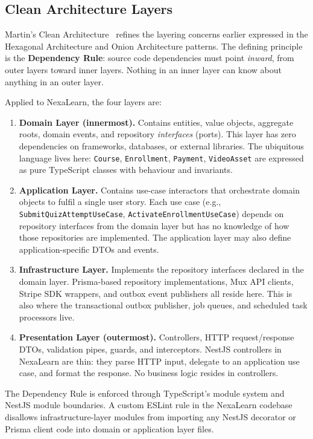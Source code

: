 \subsection{Clean Architecture Layers}

Martin's Clean Architecture~\cite{martin2017clean} refines the layering concerns earlier expressed in the Hexagonal Architecture and Onion Architecture patterns. The defining principle is the \textbf{Dependency Rule}: source code dependencies must point \textit{inward}, from outer layers toward inner layers. Nothing in an inner layer can know about anything in an outer layer.

Applied to NexaLearn, the four layers are:

\begin{enumerate}
  \item \textbf{Domain Layer (innermost).} Contains entities, value objects, aggregate roots, domain events, and repository \textit{interfaces} (ports). This layer has zero dependencies on frameworks, databases, or external libraries. The ubiquitous language lives here: \texttt{Course}, \texttt{Enrollment}, \texttt{Payment}, \texttt{VideoAsset} are expressed as pure TypeScript classes with behaviour and invariants.
  \item \textbf{Application Layer.} Contains use-case interactors that orchestrate domain objects to fulfil a single user story. Each use case (e.g., \texttt{SubmitQuizAttemptUseCase}, \texttt{ActivateEnrollmentUseCase}) depends on repository interfaces from the domain layer but has no knowledge of how those repositories are implemented. The application layer may also define application-specific DTOs and events.
  \item \textbf{Infrastructure Layer.} Implements the repository interfaces declared in the domain layer. Prisma-based repository implementations, Mux API clients, Stripe SDK wrappers, and outbox event publishers all reside here. This is also where the transactional outbox publisher, job queues, and scheduled task processors live.
  \item \textbf{Presentation Layer (outermost).} Controllers, HTTP request/response DTOs, validation pipes, guards, and interceptors. NestJS controllers in NexaLearn are thin: they parse HTTP input, delegate to an application use case, and format the response. No business logic resides in controllers.
\end{enumerate}

The Dependency Rule is enforced through TypeScript's module system and NestJS module boundaries. A custom ESLint rule in the NexaLearn codebase disallows infrastructure-layer modules from importing any NestJS decorator or Prisma client code into domain or application layer files.


